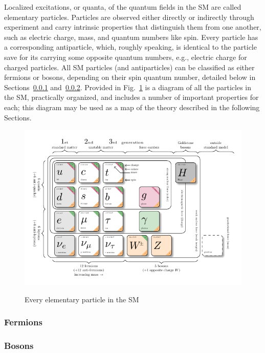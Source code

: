Localized excitations, or quanta, of the quantum fields in the SM are called elementary particles. Particles are observed either directly or indirectly through experiment and carry intrinsic properties that distinguish them from one another, such as electric charge, mass, and quantum numbers like spin. Every particle has a corresponding antiparticle, which, roughly speaking, is identical to the particle save for its carrying some opposite quantum numbers, e.g., electric charge for charged particles. All SM particles (and antiparticles) can be classified as either fermions or bosons, depending on their spin quantum number, detailed below in Sections~\ref{sec:Fermions} and~\ref{sec:Bosons}. Provided in Fig.~\ref{fig:SM} is a diagram of all the particles in the SM, practically organized, and includes a number of important properties for each; this diagram may be used as a map of the theory described in the following Sections.

\begin{figure}[H]
    \centering
    {\includegraphics[width=1\textwidth]{Images/Theory/model-physics.pdf}}
    \caption{Every elementary particle in the SM}
    \label{fig:SM}
\end{figure}

\subsubsection{Fermions} \label{sec:Fermions}


\subsubsection{Bosons} \label{sec:Bosons}
